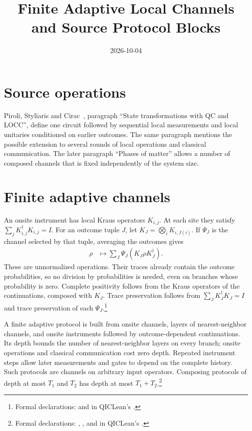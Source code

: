 \documentclass{article}
\title{Finite Adaptive Local Channels and Source Protocol Blocks}
\author{}
\date{2026-10-04}
\begin{document}
\maketitle
{}

\section{Source operations}
Piroli, Styliaris and Cirac~\cite{Piroli2021LOCC}, paragraph ``State
transformations with QC and LOCC'', define one circuit followed by sequential
local measurements and local unitaries conditioned on earlier outcomes.
The same paragraph mentions the possible extension to several rounds of
local operations and classical communication. The later paragraph ``Phases
of matter'' allows a number of composed channels that is fixed independently
of the system size.

\section{Finite adaptive channels}
An onsite instrument has local Kraus operators $K_{i,j}$.
At each site they satisfy $\sum_jK_{i,j}^{\dagger}K_{i,j}=I$.
For an outcome tuple $J$, let $K_J=\bigotimes_iK_{i,J(i)}$.
If $\Psi_J$ is the channel selected by that tuple, averaging the outcomes gives
\begin{align}
 \rho&\longmapsto\sum_J\Psi_J(K_J\rho K_J^{\dagger}).
\end{align}
These are unnormalized operations. Their traces already contain the outcome
probabilities, so no division by probabilities is needed, even on branches
whose probability is zero. Complete positivity follows from the Kraus
operators of the continuations, composed with $K_J$. Trace preservation
follows from $\sum_JK_J^{\dagger}K_J=I$ and trace preservation of each
$\Psi_J$.\footnote{Formal declarations:
 and
 in QICLean's
.}

A finite adaptive protocol is built from onsite channels, layers of
nearest-neighbor channels, and onsite instruments followed by
outcome-dependent continuations. Its depth bounds the number of
nearest-neighbor layers on every branch; onsite operations and classical
communication cost zero depth. Repeated instrument steps allow later
measurements and gates to depend on the complete history. Such protocols
are channels on arbitrary input operators. Composing protocols of depth at
most $T_1$ and $T_2$ has depth at most $T_1+T_2$.\footnote{Formal declarations:
,
, and
 in QICLean's
.}
\end{document}
